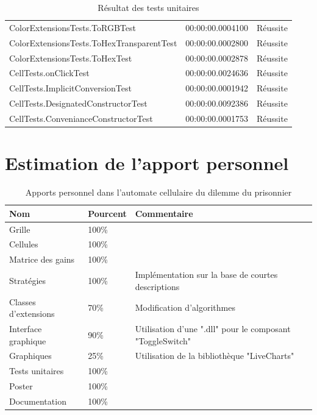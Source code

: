\documentclass[a4paper]{article}
\begin{document}
\begin{table}[htp]
\begin{tabular}{lll}
ColorExtensionsTests.ToRGBTest              & 00:00:00.0004100 & Réussite          \\
ColorExtensionsTests.ToHexTransparentTest   & 00:00:00.0002800 & Réussite          \\
ColorExtensionsTests.ToHexTest              & 00:00:00.0002878 & Réussite          \\
CellTests.onClickTest                       & 00:00:00.0024636 & Réussite          \\
CellTests.ImplicitConversionTest            & 00:00:00.0001942 & Réussite          \\
CellTests.DesignatedConstructorTest         & 00:00:00.0092386 & Réussite          \\
CellTests.ConvenianceConstructorTest        & 00:00:00.0001753 & Réussite          \\ \hline
\end{tabular}
\caption{Résultat des tests unitaires}
\end{table}
\vfill{}

\pagebreak
\section{Estimation de l'apport personnel}
\begin{table}[htp]
\centering
\begin{tabular}{lll}
\hline
\textbf{Nom}        & \textbf{Pourcent} & \textbf{Commentaire}                                      \\ \hline
Grille              & 100\%             &                                                           \\
Cellules            & 100\%             &                                                           \\
Matrice des gains   & 100\%             &                                                           \\
Stratégies          & 100\%             & Implémentation sur la base de courtes descriptions \cite{StratIPD}\cite{StratIPD2}\\
Classes d'extensions& 70\%              & Modification d'algorithmes                                \\
Interface graphique & 90\%              & Utilisation d'une ".dll" pour le composant "ToggleSwitch" \\
Graphiques          & 25\%              & Utilisation de la bibliothèque "LiveCharts"               \\
Tests unitaires     & 100\%             &                                                           \\
Poster              & 100\%             &                                                           \\
Documentation       & 100\%             &                                                           \\ \hline
\end{tabular}
\caption{Apports personnel dans l'automate cellulaire du dilemme du prisonnier}
\end{table}
\end{document}
